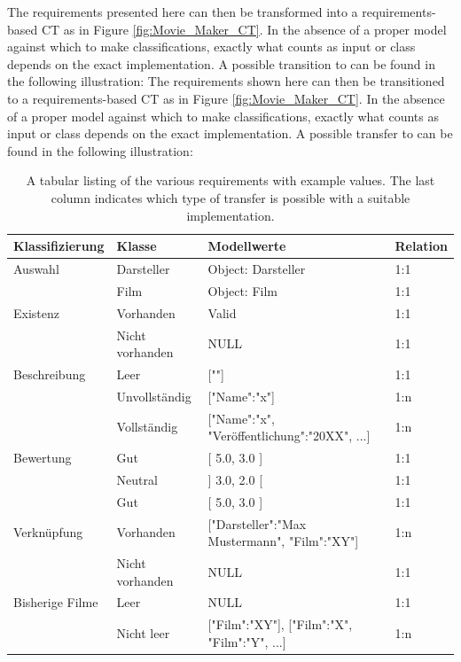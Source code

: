 The requirements presented here can then be transformed into a requirements-based CT as in Figure \autoref{fig:Movie_Maker_CT}. In the absence of a proper model against which to make classifications, exactly what counts as input or class depends on the exact implementation. A possible transition to \cite{Conrad} can be found in the following illustration: The requirements shown here can then be transitioned to a requirements-based CT as in Figure \autoref{fig:Movie_Maker_CT}. In the absence of a proper model against which to make classifications, exactly what counts as input or class depends on the exact implementation. A possible transfer to \cite{Conrad} can be found in the following illustration:

\begin{table}[t] 
\centering
\caption{A tabular listing of the various requirements with example values. The last column indicates which type of transfer is possible with a suitable implementation.}
\label{tab:ueberfuehrung}

\setlength{\tabcolsep}{1em}
\begin{tabular}{ p{2.4cm}| p{3cm} |p{5cm} |p{1.3cm} }
	\hline
	\textbf{Klassifizierung} & \textbf{Klasse} & \textbf{Modellwerte} & \textbf{Relation} \\
	\hline	
	Auswahl & Darsteller & Object: Darsteller & 1:1 \\
	\hline
	   & Film & Object: Film & 1:1 \\
	\hline
	Existenz & Vorhanden & Valid & 1:1 \\
	\hline
	   & Nicht vorhanden & NULL & 1:1 \\
	\hline
	Beschreibung & Leer & [""] & 1:1 \\
	\hline
	   & Unvollständig & ["Name":"x"] & 1:n \\
	\hline
	   & Vollständig & ["Name":"x", "Veröffentlichung":"20XX", ...] & 1:n \\
	\hline
	Bewertung & Gut & [ 5.0, 3.0 ] & 1:1 \\
	\hline
	   & Neutral & ] 3.0, 2.0 [ & 1:1 \\
	\hline 
	   & Gut & [ 5.0, 3.0 ] & 1:1 \\
	\hline 
	Verknüpfung & Vorhanden & ["Darsteller":"Max Mustermann", "Film":"XY"] & 1:n \\
	\hline 
	   & Nicht vorhanden & NULL & 1:1 \\
	\hline 
	Bisherige Filme & Leer & NULL & 1:1 \\
	\hline 
	   & Nicht leer & ["Film":"XY"], ["Film":"X", "Film":"Y", ...] & 1:n \\
	\hline 
\end{tabular}
\end{table}


